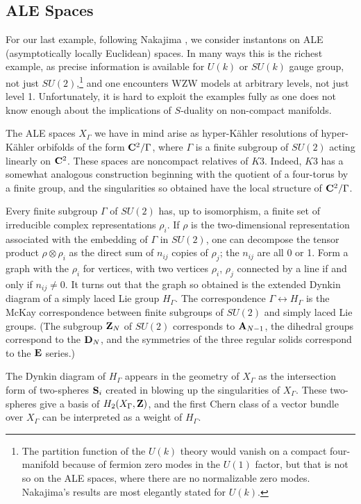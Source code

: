 \documentclass[12pt]{article}
\numberwithin{equation}{section}
\begin{document}
\subsection{ALE Spaces}

For our last example, following Nakajima \cite{nakajima},
we consider instantons on ALE (asymptotically locally Euclidean)
spaces.  In many ways this is the richest example, as precise
information is available for $U(k)$ or
$SU(k)$ gauge group, not just $SU(2)$,\footnote{The partition
  function of the $U(k)$ theory would vanish on a compact four-manifold
  because of fermion zero modes in the $U(1)$ factor, but that is not
  so on the ALE spaces, where there are no normalizable zero modes.
Nakajima's results are most elegantly stated for $U(k)$.}
and one
encounters WZW models at arbitrary levels, not just level 1.  Unfortunately,
it is hard to exploit the examples fully as one does not know enough
about the implications of $S$-duality on non-compact manifolds.

The ALE spaces $X_\Gamma$ we have in mind arise as hyper-K\"ahler
resolutions of hyper-K\"ahler orbifolds of the form
${\bf C}^2/\Gamma$, where $\Gamma$ is a finite subgroup of $SU(2)$
acting linearly on ${\bf C}^2$.
These spaces are noncompact relatives of $K3$.  Indeed, $K3$ has a somewhat
analogous construction beginning with the quotient of a four-torus
by a finite group, and the singularities so obtained have the local
structure of ${\bf C}^2/\Gamma$.

Every finite subgroup $\Gamma$ of $SU(2)$
has, up to isomorphism, a finite set of irreducible
complex representations $\rho_i$.  If $\rho$ is the two-dimensional
representation associated with the embedding of $\Gamma$ in $SU(2)$,
one can decompose the tensor product $\rho\otimes\rho_i$
as the direct sum of $n_{ij}$ copies of $\rho_j$; the $n_{ij}$
are all 0 or 1.  Form a graph with the $\rho_i$ for vertices,
with two vertices $\rho_i$, $\rho_j$ connected by a line if
and only if $n_{ij}\not= 0$.  It turns out that the graph
so obtained is the extended
Dynkin diagram of a simply laced Lie group $H_\Gamma$.
The correspondence $\Gamma\leftrightarrow H_\Gamma$ is
the McKay correspondence between finite subgroups of $SU(2)$
and simply laced Lie groups.  (The subgroup ${\bf Z}_N$ of $SU(2)$
  corresponds to ${\bf A}_{N-1}$, the dihedral groups correspond to the
  ${\bf D}_N$, and the symmetries of the three regular solids correspond
to the ${\bf E}$ series.)

The Dynkin diagram of $H_\Gamma$ appears in the geometry of $X_\Gamma$
as the intersection form of two-spheres ${\bf S}_i$ created in blowing
up the
singularities of $X_\Gamma$.  These two-spheres
give a basis of $H_2(X_\Gamma,{\bf Z})$, and the first Chern class of
a vector bundle over $X_\Gamma$ can be interpreted as a weight of $H_\Gamma$.
\end{document}
